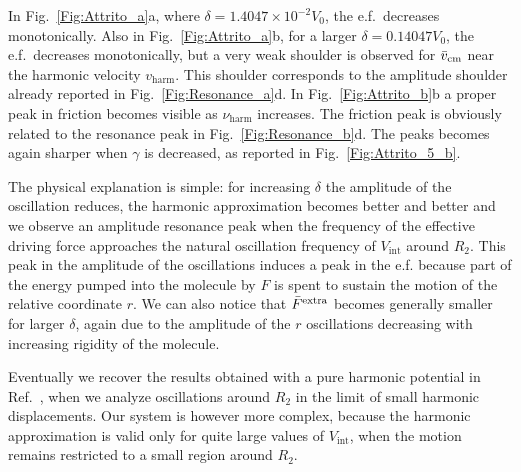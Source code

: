 In Fig.~\ref{Fig:Attrito_a}a, where $\delta = 1.4047 \times 10^{-2} V_0$, the e.f.\ decreases monotonically. Also in Fig.~\ref{Fig:Attrito_a}b, for a larger $\delta = 0.14047 V_0$, the e.f.\ decreases monotonically, but a very weak shoulder is observed for $\Bar{v}_\text{cm}$ near the harmonic velocity $v_\text{harm}$. This shoulder corresponds to the amplitude shoulder already reported in Fig.~\ref{Fig:Resonance_a}d. In Fig.~\ref{Fig:Attrito_b}b a proper peak in friction becomes visible as $\nu_\text{harm}$ increases. The friction peak is obviously related to the resonance peak in Fig.~\ref{Fig:Resonance_b}d. The peaks becomes again sharper when $\gamma$ is decreased, as reported in Fig.~\ref{Fig:Attrito_5_b}.

The physical explanation is simple: for increasing $\delta$ the amplitude of the oscillation reduces, the harmonic approximation becomes better and better and we observe an amplitude resonance peak when the frequency of the effective driving force approaches the natural oscillation frequency of $V_\text{int}$ around $R_2$. This peak in the amplitude of the oscillations induces a peak in the e.f. because part of the energy pumped into the molecule by $F$ is spent to sustain the motion of the relative coordinate $r$. We can also notice that $\Bar{F}^{\text{extra}}$ becomes generally smaller for larger $\delta$, again due to the amplitude of the $r$ oscillations decreasing with increasing rigidity of the molecule.

Eventually we recover the results obtained with a pure harmonic potential in Ref.~\cite{Fusco}, when we analyze oscillations around $R_2$ in the limit of small harmonic displacements. Our system is however more complex, because the harmonic approximation is valid only for quite large values of $V_\text{int}$, when the motion remains restricted to a small region around $R_2$. 